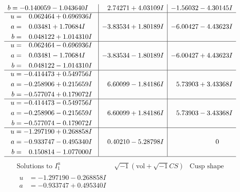 \documentclass[1p]{elsarticle_modified}
\theoremstyle{definition}
\newcommand{\I}{\sqrt{-1}}
\begin{document}
$$\begin{array}{c|c|c}
\begin{aligned}
b &= -0.140059 - 1.043640 I\end{aligned}
 & \phantom{-}2.74271 + 4.03109 I & -1.56032 - 4.30145 I \\ \hline\begin{aligned}
u &= \phantom{-}0.062464 + 0.696936 I \\
a &= \phantom{-}0.03481 + 1.70684 I \\
b &= \phantom{-}0.048122 + 1.014310 I\end{aligned}
 & -3.83534 + 1.80189 I & -6.00427 - 4.43623 I \\ \hline\begin{aligned}
u &= \phantom{-}0.062464 - 0.696936 I \\
a &= \phantom{-}0.03481 - 1.70684 I \\
b &= \phantom{-}0.048122 - 1.014310 I\end{aligned}
 & -3.83534 - 1.80189 I & -6.00427 + 4.43623 I \\ \hline\begin{aligned}
u &= -0.414473 + 0.549756 I \\
a &= -0.258906 + 0.215659 I \\
b &= -0.577074 + 0.179072 I\end{aligned}
 & \phantom{-}6.60099 - 1.84186 I & \phantom{-}5.73903 + 3.43368 I \\ \hline\begin{aligned}
u &= -0.414473 - 0.549756 I \\
a &= -0.258906 - 0.215659 I \\
b &= -0.577074 - 0.179072 I\end{aligned}
 & \phantom{-}6.60099 + 1.84186 I & \phantom{-}5.73903 - 3.43368 I \\ \hline\begin{aligned}
u &= -1.297190 + 0.268858 I \\
a &= -0.933747 - 0.495340 I \\
b &= \phantom{-}0.150814 - 1.077000 I\end{aligned}
 & \phantom{-}0.40210 - 5.28798 I & \phantom{-0.000000 } 0\\
 \hline 
 \end{array}$$\newpage$$\begin{array}{c|c|c}  
\text{Solutions to }I^u_{1}& \I (\text{vol} + \sqrt{-1}CS) & \text{Cusp shape}\\
 \hline 
\begin{aligned}
u &= -1.297190 - 0.268858 I \\
a &= -0.933747 + 0.495340 I \\

\end{aligned}
\end{array}$$
\end{document}

